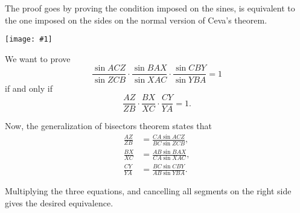 \documentclass[12pt]{article}
\newcommand{\figuraex}[2]{\begin{center}\texttt{[image: \#1]}\end{center}}
\begin{document}
The proof goes by proving the condition imposed on the sines, is equivalent to the  one imposed on the sides on the normal version of Ceva's theorem.
\figuraex{ceva}{scale=0.75}

We want to prove
\[
\frac{\sin ACZ}{\sin ZCB}\cdot\frac{\sin BAX}{\sin XAC}\cdot\frac{\sin CBY}{\sin YBA}=1
\]
if and only if
\[
\frac{AZ}{ZB}\cdot\frac{BX}{XC}\cdot\frac{CY}{YA}=1.
\]

Now, the generalization of bisectors theorem states that
\begin{align*}
\frac{AZ}{ZB} &= \frac{CA \sin ACZ}{BC \sin ZCB},\\
\frac{BX}{XC} &= \frac{AB \sin BAX}{CA \sin XAC},\\
\frac{CY}{YA} &= \frac{BC \sin CBY}{AB \sin YBA}.
\end{align*}

Multiplying the three equations, and cancelling all segments on the right side gives the desired equivalence.
\end{document}
